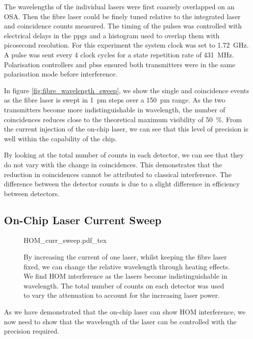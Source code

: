The wavelengths of the individual lasers were first coarsely overlapped on an \ac{OSA}. Then the fibre laser could be finely tuned relative to the integrated laser and coincidence counts measured. The timing of the pulses was controlled with electrical delays in the \acp{ppg} and a histogram used to overlap them with picosecond resolution. For this experiment the system clock was set to \SI{1.72}{\GHz}. A pulse was sent every 4 clock cycles for a state repetition rate of \SI{431}{\MHz}. Polarisation controllers and \acp{pbs} ensured both transmitters were in the same polarisation mode before interference.

In figure \ref{fig:fibre_wavelength_sweep}, we show the single and coincidence events as the fibre laser is swept in \SI{1}{pm} steps over a \SI{150}{pm} range. As the two transmitters become more indistinguishable in wavelength, the number of coincidences reduces close to the theoretical maximum visibility of \SI{50}{\percent}. From the current injection of the on-chip laser, we can see that this level of precision is well within the capability of the chip.

By looking at the total number of counts in each detector, we can see that they do not vary with the change in coincidences. This demonstrates that the reduction in coincidences cannot be attributed to classical interference. The difference between the detector counts is due to a slight difference in efficiency between detectors.

\subsection{On-Chip Laser Current Sweep}

\begin{figure}[tp]
	\centering
	\small
	\def\svgwidth{0.8\textwidth} 
	{HOM_curr_sweep.pdf_tex}
	\caption[Hong-Ou-Mandel dip between fibre components and chip by varying laser current]{By increasing the current of one laser, whilst keeping the fibre laser fixed, we can change the relative wavelength through heating effects. We find \ac{HOM} interference as the lasers become indistinguishable in wavelength. The total number of counts on each detector was used to vary the attenuation to account for the increasing laser power.}
	\label{fig:fibre_curr_sweep}
\end{figure}

As we have demonstrated that the on-chip laser can show \ac{HOM} interference, we now need to show that the wavelength of the laser can be controlled with the precision required.

